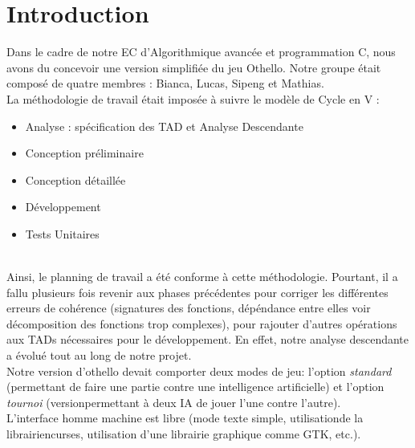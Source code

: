 \section{Introduction}
Dans le cadre de notre EC d'Algorithmique avancée et programmation C, nous avons du concevoir une version simplifiée du jeu Othello. Notre groupe était composé de quatre membres : Bianca, Lucas, Sipeng et Mathias.\\

La méthodologie de travail était imposée à suivre le modèle de Cycle en V : \\
\begin{itemize}
\item Analyse : spécification des TAD et Analyse Descendante
\item Conception préliminaire
\item Conception détaillée
\item Développement
\item Tests Unitaires
\end{itemize}\\

Ainsi, le planning de travail a été conforme à cette méthodologie. Pourtant, il a fallu plusieurs fois revenir aux phases précédentes pour corriger les différentes erreurs de cohérence (signatures des fonctions, dépéndance entre elles voir décomposition des fonctions trop complexes), pour rajouter d'autres opérations aux TADs nécessaires pour le développement. En effet, notre analyse descendante a évolué tout au long de notre projet. \\

Notre version d'othello devait comporter deux modes de jeu: l'option \textit{standard} (permettant de faire une partie contre une intelligence artificielle) et l'option \textit{tournoi} (versionpermettant à deux IA de jouer l'une contre l'autre). \\

L’interface homme machine est libre (mode texte simple, utilisationde la librairiencurses, utilisation d’une librairie graphique comme GTK, etc.).\\

\newpage

